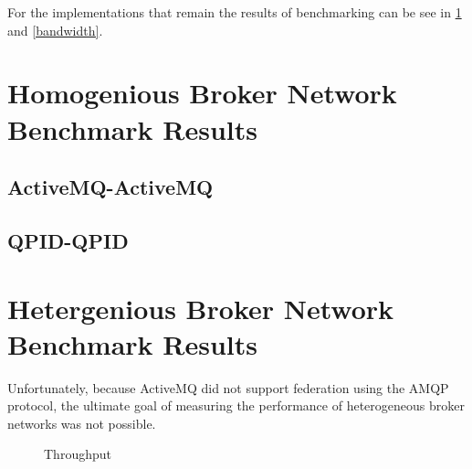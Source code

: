 \documentclass{thesis}
\begin{document}
For the implementations that remain the results of benchmarking can be see in \ref{throughput} and \ref{bandwidth}.

\section{Homogenious Broker Network Benchmark Results}
\subsection{ActiveMQ-ActiveMQ}
\subsection{QPID-QPID}

\section{Hetergenious Broker Network Benchmark Results}
Unfortunately, because ActiveMQ did not support federation using the AMQP protocol, the ultimate goal of measuring the performance of heterogeneous broker networks was not possible.

\begin{figure}[tb] 
\centering
\caption{Throughput}
\label{throughput}
\end{figure}
\end{document}
